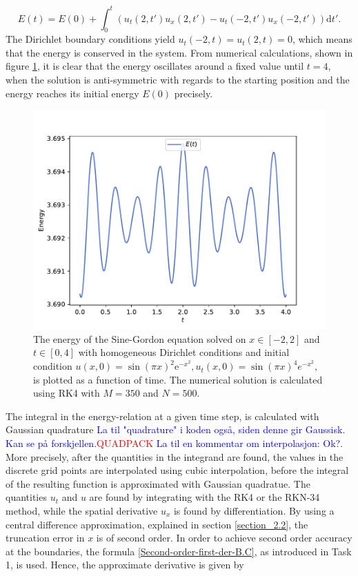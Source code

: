 \begin{equation*}
    E(t) = E(0) + \int_0^t \left( u_t(2,t')u_x(2,t')-u_t(-2,t')u_x(-2,t') \right) \mathrm{d}t'.
\end{equation*}
The Dirichlet boundary conditions yield $u_t(-2,t)=u_t(2,t)=0$, which means that the energy is conserved in the system. From numerical calculations, shown in figure \ref{fig:part2f-energy-form}, it is clear that the energy oscillates around a fixed value until $t=4$, when the solution is anti-symmetric with regards to the starting position and the energy reaches its initial energy $E(0)$ precisely. 

\begin{figure}[t]
    \centering
    \includegraphics[width = 0.85\linewidth]{plots/part2f_energy.pdf}
    \caption{The energy of the Sine-Gordon equation solved on $x \in [-2,2]$ and $t \in [0,4]$ with homogeneous Dirichlet conditions and initial condition $u(x,0)=\sin(\pi x)^2 \mathrm{e}^{-x^2}, u_t(x,0) = \sin{(\pi x)^4e^{-x^2}}$, is plotted as a function of time. The numerical solution is calculated using RK4 with $M=350$ and $N=500$.} 
    \label{fig:part2f-energy-form}
\end{figure}

The integral in the energy-relation at a given time step, is calculated with Gaussian quadrature \textcolor{blue}{La til "quadrature" i koden også, siden denne gir Gaussisk. Kan se på forskjellen.}\textcolor{red}{QUADPACK} \textcolor{blue}{La til en kommentar om interpolasjon: Ok?}. More precisely, after the quantities in the integrand are found, the values in the discrete grid points are interpolated using cubic interpolation, before the integral of the resulting function is approximated with Gaussian quadratue. The quantities $u_t$ and $u$ are found by integrating with the RK4 or the RKN-34 method, while the spatial derivative $u_x$ is found by differentiation. By using a central difference approximation, explained in section \ref{section_2.2}, the truncation error in $x$ is of second order. In order to achieve second order accuracy at the boundaries, the formula \eqref{Second-order-first-der-B.C}, as introduced in Task 1, is used. Hence, the approximate derivative is given by 

